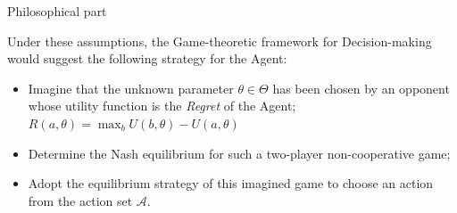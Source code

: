 \documentclass{beamer}
\theoremstyle{definition}
\begin{document}
\begin{frame}{Philosophical part}

Under these assumptions, the Game-theoretic framework for Decision-making would suggest the following strategy for the Agent:

\begin{itemize}
    \item Imagine that the unknown parameter $\theta \in \Theta$ has been chosen by an opponent whose utility function is the \emph{Regret} of the Agent; $R(a,\theta) = \max_{b} U(b,\theta)-U(a,\theta)$
    \item Determine the Nash equilibrium for such a two-player non-cooperative game;
    \item Adopt the equilibrium strategy of this imagined game to choose an action from the action set $\mathcal{A}$.
\end{itemize}

\end{frame}
\end{document}

